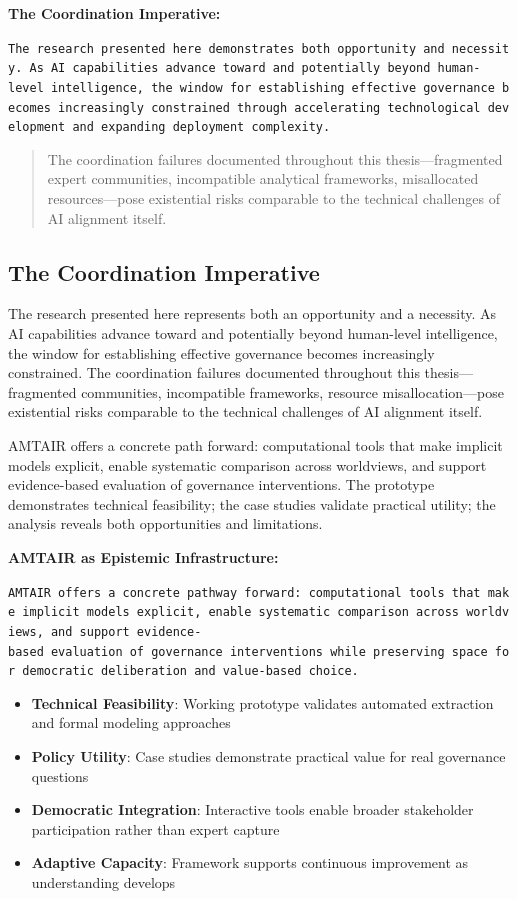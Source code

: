 \documentclass[
  11pt,
  letterpaper,
]{book}
\providecommand{\tightlist}{%
  \setlength{\itemsep}{0pt}\setlength{\parskip}{0pt}}
\begin{document}
\textbf{The Coordination Imperative:}

\texttt{The\ research\ presented\ here\ demonstrates\ both\ opportunity\ and\ necessity.\ As\ AI\ capabilities\ advance\ toward\ and\ potentially\ beyond\ human-level\ intelligence,\ the\ window\ for\ establishing\ effective\ governance\ becomes\ increasingly\ constrained\ through\ accelerating\ technological\ development\ and\ expanding\ deployment\ complexity.}

\begin{quote}
The coordination failures documented throughout this thesis---fragmented
expert communities, incompatible analytical frameworks, misallocated
resources---pose existential risks comparable to the technical
challenges of AI alignment itself.
\end{quote}

\subsection{The Coordination
Imperative}\label{sec-coordination-imperative}

The research presented here represents both an opportunity and a
necessity. As AI capabilities advance toward and potentially beyond
human-level intelligence, the window for establishing effective
governance becomes increasingly constrained. The coordination failures
documented throughout this thesis---fragmented communities, incompatible
frameworks, resource misallocation---pose existential risks comparable
to the technical challenges of AI alignment itself.

AMTAIR offers a concrete path forward: computational tools that make
implicit models explicit, enable systematic comparison across
worldviews, and support evidence-based evaluation of governance
interventions. The prototype demonstrates technical feasibility; the
case studies validate practical utility; the analysis reveals both
opportunities and limitations.

\textbf{AMTAIR as Epistemic Infrastructure:}

\texttt{AMTAIR\ offers\ a\ concrete\ pathway\ forward:\ computational\ tools\ that\ make\ implicit\ models\ explicit,\ enable\ systematic\ comparison\ across\ worldviews,\ and\ support\ evidence-based\ evaluation\ of\ governance\ interventions\ while\ preserving\ space\ for\ democratic\ deliberation\ and\ value-based\ choice.}

\begin{itemize}
\tightlist
\item
  \textbf{Technical Feasibility}: Working prototype validates automated
  extraction and formal modeling approaches
\item
  \textbf{Policy Utility}: Case studies demonstrate practical value for
  real governance questions
\item
  \textbf{Democratic Integration}: Interactive tools enable broader
  stakeholder participation rather than expert capture
\item
  \textbf{Adaptive Capacity}: Framework supports continuous improvement
  as understanding develops
\end{itemize}
\end{document}
